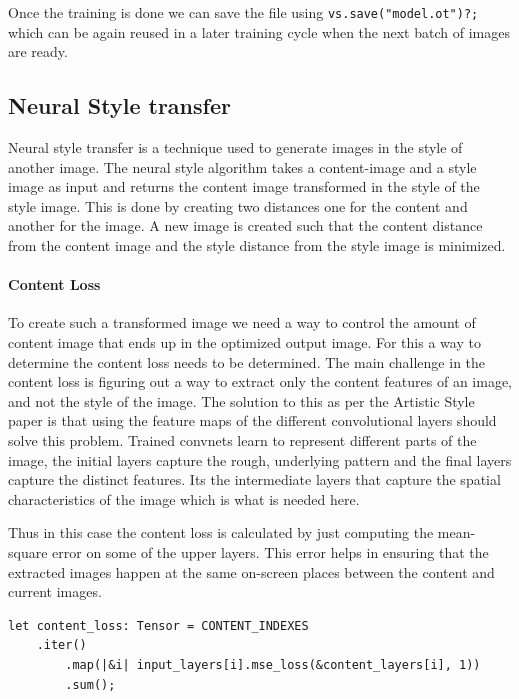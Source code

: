 \documentclass{book}
\begin{document}
Once the training is done we can save the file using \lstinline{vs.save("model.ot")?;} which can be again reused in a later training cycle when the next batch of images are ready.

\label{sub:Training}
\label{sec:Transfer Learning}

\subsection{Neural Style transfer}%
Neural style transfer is a technique used to generate images in the style of another image. The neural style algorithm takes a content-image and a style image as input and returns the content image transformed in the style of the style image. This is done by creating two distances one for the content and another for the image. A new image is created such that the content distance from the content image and the style distance from the style image is minimized.

\paragraph{Content Loss}%
To create such a transformed image we need a way to control the amount of content image that ends up in the optimized output image. For this a way to determine the content loss needs to be determined. The main challenge in the content loss is figuring out a way to extract only the content features of an image, and not the style of the image. The solution to this as per the Artistic Style paper\cite[]{CV:2} is that using the feature maps of the different convolutional layers should solve this problem. Trained convnets learn to represent different parts of the image, the initial layers capture the rough, underlying pattern and the final layers capture the distinct features. Its the intermediate layers that capture the spatial characteristics of the image which is what is needed here.

Thus in this case the content loss is calculated by just computing the mean-square error on some of the upper layers. This error helps in ensuring that the extracted images happen at the same on-screen places between the content and current images.

\begin{lstlisting}[caption={https://github.com/LaurentMazare/tch-rs/blob/master/examples/neural-style-transfer/main.rs}, basicstyle=\small]
let content_loss: Tensor = CONTENT_INDEXES
	.iter()
        .map(|&i| input_layers[i].mse_loss(&content_layers[i], 1))
        .sum();
\end{lstlisting}
\end{document}
